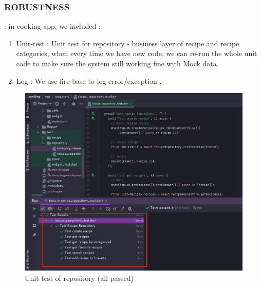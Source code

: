 \documentclass{article}
\begin{document}
 \subsubsection{ROBUSTNESS}  :  in cooking app, we included : 
 \begin{enumerate}
 \item Unit-test : Unit test for repository - business layer of recipe and recipe categories, when every time we have new code, we can re-run the whole unit code to make sure the system still working fine with Mock data.
 \item Log : We use fire-base to log error/exception .
 \end{enumerate}
 \begin{figure}[h!]
    \centering
    \includegraphics[scale=0.07]{Images/unit-test-repo.png}
    \caption{Unit-test of repository (all passed)}
    \label{fig:cookingbook}
\end{figure}
\newpage
\end{document}
